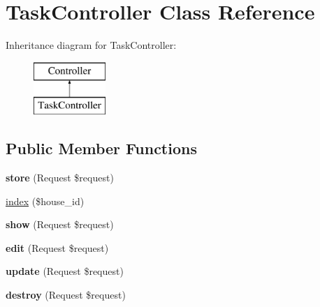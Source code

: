 \hypertarget{class_app_1_1_http_1_1_controllers_1_1_api_1_1_task_controller}{}\section{Task\+Controller Class Reference}
\label{class_app_1_1_http_1_1_controllers_1_1_api_1_1_task_controller}
Inheritance diagram for Task\+Controller\+:\begin{figure}[H]
\begin{center}
\leavevmode
\includegraphics[height=2.000000cm]{class_app_1_1_http_1_1_controllers_1_1_api_1_1_task_controller}
\end{center}
\end{figure}
\subsection*{Public Member Functions}
\begin{DoxyCompactItemize}
\item 
\mbox{\label{class_app_1_1_http_1_1_controllers_1_1_api_1_1_task_controller_a9ef485163104597c12185b53cdacf638}} 
{\bfseries store} (Request \$request)
\item 
\mbox{\hyperlink{class_app_1_1_http_1_1_controllers_1_1_api_1_1_task_controller_a03e28cc4ace81818bfa12c56ea253809}{index}} (\$house\+\_\+id)
\item 
\mbox{\label{class_app_1_1_http_1_1_controllers_1_1_api_1_1_task_controller_a5ab3bd1c209b4353ac32bd7ee51985d2}} 
{\bfseries show} (Request \$request)
\item 
\mbox{\label{class_app_1_1_http_1_1_controllers_1_1_api_1_1_task_controller_a51cdc624a76cd9d446b40084397ae2e8}} 
{\bfseries edit} (Request \$request)
\item 
\mbox{\label{class_app_1_1_http_1_1_controllers_1_1_api_1_1_task_controller_afdc1029c759eec7e6241e0265b43551a}} 
{\bfseries update} (Request \$request)
\item 
\mbox{\label{class_app_1_1_http_1_1_controllers_1_1_api_1_1_task_controller_acf421ebc9a80cdacabf896fc936a8c25}} 
{\bfseries destroy} (Request \$request)
\end{DoxyCompactItemize}
